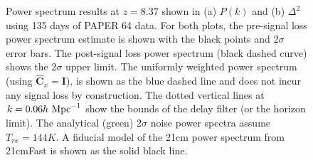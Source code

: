 \documentclass[onecolumn]{emulateapj} \shorttitle{}
\newcommand{\hMpci}{h\ {\rm Mpc}^{-1}}
\begin{document}
\begin{figure}%
    \centering
    \qquad
    \caption{Power spectrum results at $z=8.37$ shown in (a) $P(k)$ and (b) $\Delta^{2}$
             using 135 days of PAPER 64 data. For both plots, the pre-signal
             loss power spectrum estimate is shown with the black points and $2\sigma$
             error bars. The post-signal loss power spectrum (black dashed curve) shows the 2$\sigma$ upper limit.
             The uniformly weighted power spectrum (using $\widehat{\textbf{C}}_{x}=\textbf{I}$), is shown as the blue
             dashed line and does not incur any signal loss by construction.
             The dotted vertical lines at $k=0.06\hMpci$ show the bounds of the delay filter (or the horizon limit).
             The analytical (green) 2$\sigma$ noise power spectra assume $T_{rx}=144K$. A fiducial
             model of the 21cm power spectrum from 21cmFast is shown as the solid black line.}
    \label{fig:updated_pspec}%
\end{figure}

\nocite{*}


\end{document}

